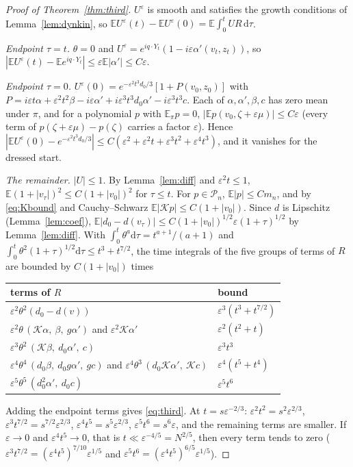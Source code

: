 \documentclass[11pt]{article}
\newcommand{\dd}{\mathrm{d}}
\newcommand{\E}{\mathbb{E}}
\newcommand{\eps}{\varepsilon}
\newcommand{\cK}{\mathcal{K}}
\newcommand{\cP}{\mathcal{P}}
\theoremstyle{remark}
\begin{document}
\begin{proof}[Proof of Theorem~\ref{thm:third}]
$U^\eps$ is smooth and satisfies the growth conditions of
Lemma~\ref{lem:dynkin}, so
$\E U^\eps(t)-\E U^\eps(0)=\E\int_0^tUR\,\dd\tau$.

\emph{Endpoint $\tau=t$.} $\theta=0$ and
$U^\eps=e^{iq\cdot Y_t}(1-i\eps\alpha'(v_t,z_t))$, so
$|\E U^\eps(t)-\E e^{iq\cdot Y_t}|\le\eps\E|\alpha'|\le C\eps$.

\emph{Endpoint $\tau=0$.} $U^\eps(0)=e^{-\eps^2t^3d_0/3}[1+P(v_0,z_0)]$ with
$P=i\eps t\alpha+\eps^2t^2\beta-i\eps\alpha'+i\eps^3t^3d_0\alpha'-i\eps^3t^3c$.
Each of $\alpha,\alpha',\beta,c$ has zero mean under $\pi$, and for a
polynomial $p$ with $\E_\pi p=0$,
$|\E p(v_0,\zeta+\eps\mu)|\le C\eps$ (every term of
$p(\zeta+\eps\mu)-p(\zeta)$ carries a factor $\eps$). Hence
$|\E U^\eps(0)-e^{-\eps^2t^3d_0/3}|\le C(\eps^2+\eps^2t+\eps^3t^2+\eps^4t^3)$,
and it vanishes for the dressed start.

\emph{The remainder.} $|U|\le1$. By Lemma~\ref{lem:diff} and $\eps^2t\le1$,
$\E(1+|v_\tau|)^2\le C(1+|v_0|)^2$ for $\tau\le t$. For $p\in\cP_n$,
$\E|p|\le Cm_n$, and by \eqref{eq:Kbound} and Cauchy--Schwarz
$\E|\cK p|\le C(1+|v_0|)$. Since $d$ is Lipschitz (Lemma~\ref{lem:coef}),
$\E|d_0-d(v_\tau)|\le C(1+|v_0|)^{1/2}\eps(1+\tau)^{1/2}$ by
Lemma~\ref{lem:diff}. With
$\int_0^t\theta^a\dd\tau=t^{a+1}/(a+1)$ and
$\int_0^t\theta^2(1+\tau)^{1/2}\dd\tau\le t^3+t^{7/2}$, the time integrals of
the five groups of terms of $R$ are bounded by $C(1+|v_0|)$ times
\begin{center}
\renewcommand{\arraystretch}{1.3}
\begin{tabular}{ll}
  terms of $R$ & bound \\ \hline
  $\eps^2\theta^2(d_0-d(v))$ & $\eps^3(t^3+t^{7/2})$ \\
  $\eps^2\theta\,(\cK\alpha,\ \beta,\ g\alpha')$ and $\eps^2\cK\alpha'$
     & $\eps^2(t^2+t)$ \\
  $\eps^3\theta^2\,(\cK\beta,\ d_0\alpha',\ c)$ & $\eps^3t^3$ \\
  $\eps^4\theta^4\,(d_0\beta,\ d_0g\alpha',\ gc)$ and
  $\eps^4\theta^3\,(d_0\cK\alpha',\ \cK c)$ & $\eps^4(t^5+t^4)$ \\
  $\eps^5\theta^5\,(d_0^2\alpha',\ d_0c)$ & $\eps^5t^6$ \\
\end{tabular}
\end{center}
Adding the endpoint terms gives \eqref{eq:third}. At $t=s\eps^{-2/3}$:
$\eps^2t^2=s^2\eps^{2/3}$, $\eps^3t^{7/2}=s^{7/2}\eps^{2/3}$,
$\eps^4t^5=s^5\eps^{2/3}$, $\eps^5t^6=s^6\eps$, and the remaining terms are
smaller. If $\eps\to0$ and $\eps^4t^5\to0$, that is
$t\ll\eps^{-4/5}=N^{2/5}$, then every term tends to zero
($\eps^3t^{7/2}=(\eps^4t^5)^{7/10}\eps^{1/5}$ and
$\eps^5t^6=(\eps^4t^5)^{6/5}\eps^{1/5}$).
\end{proof}
\end{document}
